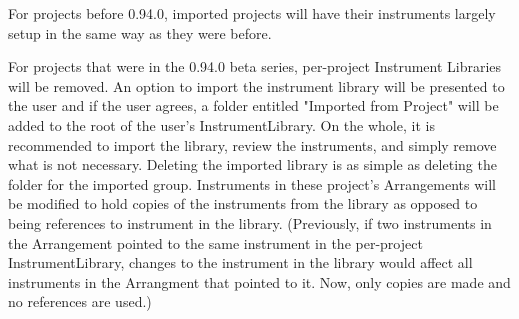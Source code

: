 For projects before 0.94.0, imported projects will have their
instruments largely setup in the same way as they were before.

For projects that were in the 0.94.0 beta series, per-project Instrument
Libraries will be removed. An option to import the instrument library
will be presented to the user and if the user agrees, a folder entitled
"Imported from Project" will be added to the root of the user's
InstrumentLibrary. On the whole, it is recommended to import the
library, review the instruments, and simply remove what is not
necessary. Deleting the imported library is as simple as deleting the
folder for the imported group. Instruments in these project's
Arrangements will be modified to hold copies of the instruments from the
library as opposed to being references to instrument in the library.
(Previously, if two instruments in the Arrangement pointed to the same
instrument in the per-project InstrumentLibrary, changes to the
instrument in the library would affect all instruments in the Arrangment
that pointed to it. Now, only copies are made and no references are
used.)
